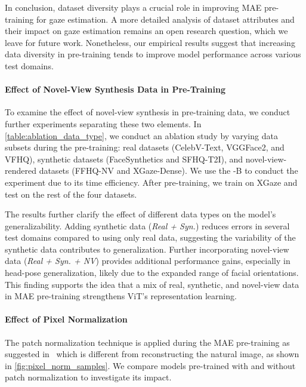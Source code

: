 In conclusion, dataset diversity plays a crucial role in improving MAE pre-training for gaze estimation.
A more detailed analysis of dataset attributes and their impact on gaze estimation remains an open research question, which we leave for future work.
Nonetheless, our empirical results suggest that increasing data diversity in pre-training tends to improve model performance across various test domains.



\paragraph{Effect of Novel-View Synthesis Data in Pre-Training}\label{sec:ablation_novel_view_data}
To examine the effect of novel-view synthesis in pre-training data, we conduct further experiments separating these two elements.
In \cref{table:ablation_data_type}, we conduct an ablation study by varying data subsets during the pre-training: real datasets (CelebV-Text, VGGFace2, and VFHQ), synthetic datasets (FaceSynthetics and SFHQ-T2I), and novel-view-rendered datasets (FFHQ-NV and XGaze-Dense).
We use the \methodname-B to conduct the experiment due to its time efficiency.
After pre-training, we train on XGaze and test on the rest of the four datasets. 

The results further clarify the effect of different data types on the model's generalizability.
Adding synthetic data (\textit{Real + Syn.}) reduces errors in several test domains compared to using only real data, suggesting the variability of the synthetic data contributes to generalization.
Further incorporating novel-view data (\textit{Real + Syn. + NV}) provides additional performance gains, especially in head-pose generalization, likely due to the expanded range of facial orientations.
This finding supports the idea that a mix of real, synthetic, and novel-view data in MAE pre-training strengthens ViT’s representation learning.



\paragraph{Effect of Pixel Normalization}\label{sec:ablation_pixel_norm}
The patch normalization technique is applied during the MAE pre-training as suggested in~\cite{he2022masked} which is different from reconstructing the natural image, as shown in \cref{fig:pixel_norm_samples}.
We compare models pre-trained with and without patch normalization to investigate its impact.

